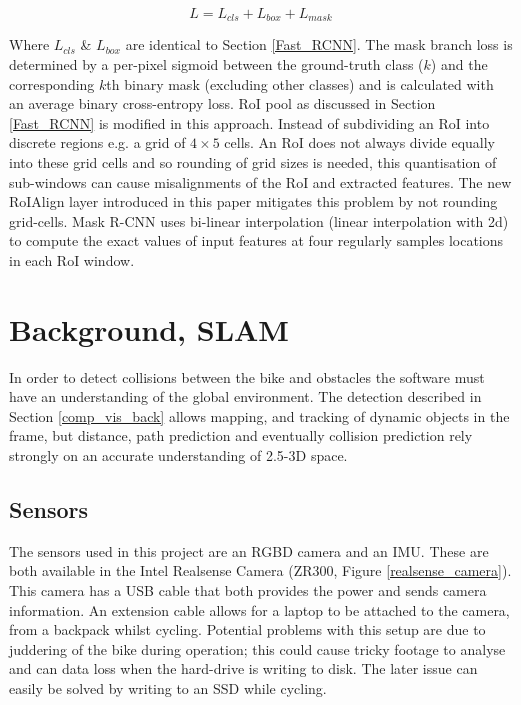 \documentclass[a4paper,11pt,notitlepage]{article}
\begin{document}
\begin{equation}
\label{maskrcnnloss}
L = L_{cls} + L_{box} + L_{mask}
\end{equation}

Where $L_{cls}$ \& $L_{box}$ are identical to Section \ref{Fast_RCNN}. The mask branch loss is determined by a per-pixel sigmoid between the ground-truth class ($k$) and the corresponding $k$th binary mask (excluding other classes) and is calculated with an average binary cross-entropy loss.
\newline \newline
RoI pool as discussed in Section \ref{Fast_RCNN} is modified in this approach. Instead of subdividing an RoI into discrete regions e.g. a grid of $4 \times 5$ cells. An RoI does not always divide equally into these grid cells and so rounding of grid sizes is needed, this quantisation of sub-windows can cause misalignments of the RoI and extracted features. The new RoIAlign layer introduced in this paper mitigates this problem by not rounding grid-cells. Mask R-CNN uses bi-linear interpolation (linear interpolation with 2d) to compute the exact values of input features at four regularly samples locations in each RoI window.

\section{Background, SLAM} \label{back_slam}
In order to detect collisions between the bike and obstacles the software must have an understanding of the global environment. The detection described in Section \ref{comp_vis_back} allows mapping, and tracking of dynamic objects in the frame, but distance, path prediction and eventually collision prediction rely strongly on an accurate understanding of 2.5-3D space.

\subsection{Sensors}
The sensors used in this project are an RGBD camera and an IMU. These are both available in the Intel Realsense Camera (ZR300, Figure \ref{realsense_camera}). This camera has a USB cable that both provides the power and sends camera information. An extension cable allows for a laptop to be attached to the camera, from a backpack whilst cycling. Potential problems with this setup are due to juddering of the bike during operation; this could cause tricky footage to analyse and can data loss when the hard-drive is writing to disk. The later issue can easily be solved by writing to an SSD while cycling.
\end{document}
